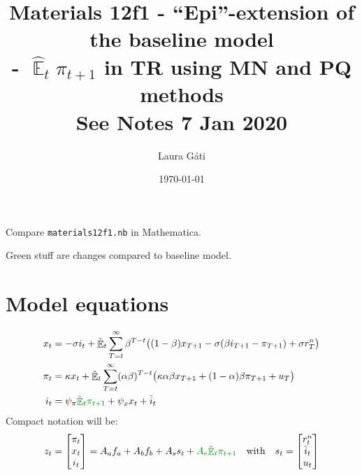 \documentclass[11pt]{article}
\renewcommand{\[}{\begin{equation}}
\renewcommand{\]}{\end{equation}}
\DeclareMathOperator{\E}{\mathbb{E}}
\begin{document}
\linespread{1.0}

\title{Materials 12f1 - ``Epi''-extension of the baseline model\\
- $\hat{\E}_t\pi_{t+1}$ in TR using MN and PQ methods
\\
\small{See Notes 7 Jan 2020}}
\author{Laura G\'ati} 
\date{\today}
\maketitle




Compare \texttt{materials12f1.nb} in Mathematica.

\textcolor{mygreen}{Green} stuff are changes compared to baseline model.
\section{Model equations}
\begin{align}
x_t &=  -\sigma i_t +\hat{\E}_t \sum_{T=t}^{\infty} \beta^{T-t }\big( (1-\beta)x_{T+1} - \sigma(\beta i_{T+1} - \pi_{T+1}) +\sigma r_T^n \big)  \label{prestons18}  \\
\pi_t &= \kappa x_t +\hat{\E}_t \sum_{T=t}^{\infty} (\alpha\beta)^{T-t }\big( \kappa \alpha \beta x_{T+1} + (1-\alpha)\beta \pi_{T+1} + u_T\big) \label{prestons19}  \\
i_t &= \psi_{\pi}\textcolor{mygreen}{\hat{\E}_t\pi_{t+1}} + \psi_{x} x_t  + \bar{i}_t \label{TR}
\end{align}
Compact notation will be:
\begin{equation}
z_t = \begin{bmatrix} \pi_t \\ x_t \\ i_t \end{bmatrix} = A_a f_{a} + A_b f_{b} + A_s s_t + \textcolor{mygreen}{A_e\hat{\E}_t\pi_{t+1}} \quad \text{with} \quad s_t = \begin{bmatrix} r_t^n \\ \bar{i}_t \\ u_t \end{bmatrix}
\end{equation}
\end{document}

